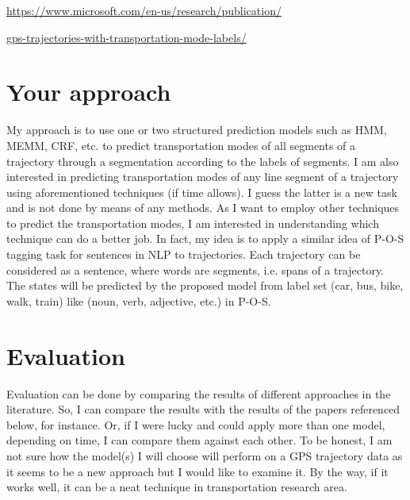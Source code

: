 \documentclass[11pt]{myclass}
\begin{document}
\url{https://www.microsoft.com/en-us/research/publication/}

\hspace{1.3cm} \url{gps-trajectories-with-transportation-mode-labels/}

\section{Your approach}

My approach is to use one or two structured prediction models such as HMM, MEMM, CRF, etc. to predict transportation modes of all segments of a trajectory through a segmentation according to the labels of segments. 
I am also interested in predicting transportation modes of any line segment of a trajectory using aforementioned techniques (if time allows). I guess the latter is a new task and is not done by means of any methods. As I want to employ other techniques to predict the transportation modes, I am interested in understanding which technique can do a better job. 
In fact, my idea is to apply a similar idea of P-O-S tagging task for sentences in NLP to trajectories. Each trajectory can be considered as a sentence, where words are segments, i.e. spans of a trajectory. The states will be predicted by the proposed model from label set (car, bus, bike, walk, train) like (noun, verb, adjective, etc.) in P-O-S. 

\section{Evaluation}

Evaluation can be done by comparing the results of different approaches in the literature. So, I can compare the results with the results of the papers referenced below, for instance. Or, if I were lucky and could apply more than one model, depending on time, I can compare them against each other. To be honest, I am not sure how the model(s) I will choose will perform on a GPS trajectory data as it seems to be a new approach but I would like to examine it. By the way, if it works well, it can be a neat technique in transportation research area. 




\end{document}
